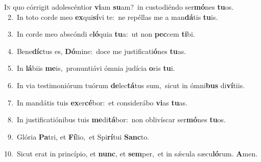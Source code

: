 \lettrine{\initial\textcolor{\initialcolor}{I}}{n} quo córrigit adolescéntior \textbf{vi}\-am \textbf{su}\-am?~\star in custodiéndo ser\-\textbf{mó}\-nes \textbf{tu}\-os.\\
{\numbfont\textcolor{\numbcolor}{~2.}}~In toto corde meo \textbf{ex}\-qui\-\textbf{sí}\-vi te:~\star ne repéllas me a man\-\textbf{dá}\-tis \textbf{tu}\-is.\par
{\numbfont\textcolor{\numbcolor}{~3.}}~In corde meo abscóndi e\-\textbf{ló}\-quia \textbf{tu}\-a:~\star ut non \textbf{pec}\-cem \textbf{ti}\-bi.\par
{\numbfont\textcolor{\numbcolor}{~4.}}~Bene\-\textbf{díc}\-tus es, \textbf{Dó}\-mine:~\star doce me justificati\-\textbf{ó}\-nes \textbf{tu}\-as.\par
{\numbfont\textcolor{\numbcolor}{~5.}}~In \textbf{lá}\-biis \textbf{me}\-is,~\star pronuntiávi ómnia judícia \textbf{o}\-ris \textbf{tu}\-i.\par
{\numbfont\textcolor{\numbcolor}{~6.}}~In via testimoniórum tuórum \textbf{de}\-lec\-\textbf{tá}\-tus sum,~\star sicut in ómni\textbf{bus} di\-\textbf{ví}\-tiis.\par
{\numbfont\textcolor{\numbcolor}{~7.}}~In mandátis tuis \textbf{ex}\-er\-\textbf{cé}\-bor:~\star et considerábo \textbf{vi}\-as \textbf{tu}\-as.\par
{\numbfont\textcolor{\numbcolor}{~8.}}~In justificatiónibus tuis \textbf{me}\-di\-\textbf{tá}\-bor:~\star non oblivíscar ser\-\textbf{mó}\-nes \textbf{tu}\-os.\par
{\numbfont\textcolor{\numbcolor}{~9.}}~Glória \textbf{Pa}\-tri, et \textbf{Fí}\-lio,~\star et Spi\-\textbf{rí}\-tui \textbf{Sanc}\-to.\par
{\numbfont\textcolor{\numbcolor}{10.}}~Sicut erat in princípio, et \textbf{nunc}\-, et \textbf{sem}\-per,~\star et in sǽcula sæcu\-\textbf{ló}\-rum. \textbf{A}\-men.\par
